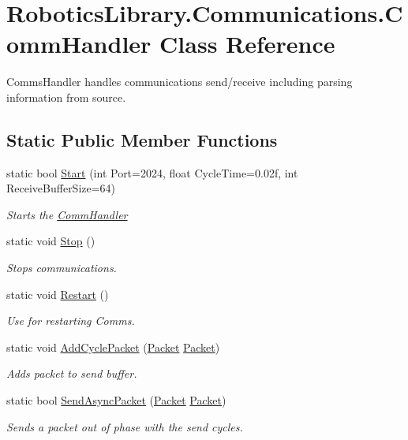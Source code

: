 \hypertarget{class_robotics_library_1_1_communications_1_1_comm_handler}{}\section{Robotics\+Library.\+Communications.\+Comm\+Handler Class Reference}
\label{class_robotics_library_1_1_communications_1_1_comm_handler}


Comms\+Handler handles communications send/receive including parsing information from source.  


\subsection*{Static Public Member Functions}
\begin{DoxyCompactItemize}
\item 
static bool \hyperlink{class_robotics_library_1_1_communications_1_1_comm_handler_a2c324044e0ecb019565eaa6d20fa0c27}{Start} (int Port=2024, float Cycle\+Time=0.\+02f, int Receive\+Buffer\+Size=64)
\begin{DoxyCompactList}\small\item\em Starts the \hyperlink{class_robotics_library_1_1_communications_1_1_comm_handler}{Comm\+Handler} \end{DoxyCompactList}\item 
static void \hyperlink{class_robotics_library_1_1_communications_1_1_comm_handler_aa49345cc033a788471167c08319e7af4}{Stop} ()
\begin{DoxyCompactList}\small\item\em Stops communications. \end{DoxyCompactList}\item 
static void \hyperlink{class_robotics_library_1_1_communications_1_1_comm_handler_a7e2e2f2de6d1272ab96507f17ee5e35c}{Restart} ()
\begin{DoxyCompactList}\small\item\em Use for restarting Comms. \end{DoxyCompactList}\item 
static void \hyperlink{class_robotics_library_1_1_communications_1_1_comm_handler_a9e875d4ed51f313878035fabb97f7c19}{Add\+Cycle\+Packet} (\hyperlink{class_robotics_library_1_1_communications_1_1_packet}{Packet} \hyperlink{class_robotics_library_1_1_communications_1_1_packet}{Packet})
\begin{DoxyCompactList}\small\item\em Adds packet to send buffer. \end{DoxyCompactList}\item 
static bool \hyperlink{class_robotics_library_1_1_communications_1_1_comm_handler_ac79d756af9d0a96058a2a26284591235}{Send\+Async\+Packet} (\hyperlink{class_robotics_library_1_1_communications_1_1_packet}{Packet} \hyperlink{class_robotics_library_1_1_communications_1_1_packet}{Packet})
\begin{DoxyCompactList}\small\item\em Sends a packet out of phase with the send cycles. \end{DoxyCompactList}\end{DoxyCompactItemize}

